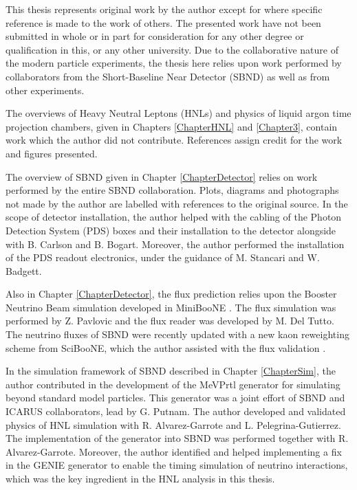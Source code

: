 
\begin{declaration}

This thesis represents original work by the author except for where specific reference is made to the work of others.
The presented work have not been submitted in whole or in part for consideration for any other degree or qualification in this, or any other university. 
Due to the collaborative nature of the modern particle experiments, the thesis here relies upon work performed by collaborators from the Short-Baseline Near Detector (SBND) as well as from other experiments.

The overviews of Heavy Neutral Leptons (HNLs) and physics of liquid argon time projection chambers, given in Chapters \ref{ChapterHNL} and \ref{Chapter3}, contain work which the author did not contribute.
References assign credit for the work and figures presented.

The overview of SBND given in Chapter \ref{ChapterDetector} relies on work performed by the entire SBND collaboration.
Plots, diagrams and photographs not made by the author are labelled with references to the original source.
In the scope of detector installation, the author helped with the cabling of the Photon Detection System (PDS) boxes and their installation to the detector alongside with B. Carlson and B. Bogart.
Moreover, the author performed the installation of the PDS readout electronics, under the guidance of M. Stancari and W. Badgett.

Also in Chapter \ref{ChapterDetector}, the flux prediction relies upon the Booster Neutrino Beam simulation developed in MiniBooNE \cite{BNBFlux}.
The flux simulation was performed by Z. Pavlovic and the flux reader was developed by M. Del Tutto. 
The neutrino fluxes of SBND were recently updated with a new kaon reweighting scheme from SciBooNE, which the author assisted with the flux validation \cite{SciBooNE}. 

In the simulation framework of SBND described in Chapter \ref{ChapterSim}, the author contributed in the development of the MeVPrtl generator for simulating beyond standard model particles.
This generator was a joint effort of SBND and ICARUS collaborators, lead by G. Putnam.
The author developed and validated physics of HNL simulation with R. Alvarez-Garrote and L. Pelegrina-Gutierrez.
The implementation of the generator into SBND was performed together with R. Alvarez-Garrote.
Moreover, the author identified and helped implementing a fix in the GENIE generator to enable the timing simulation of neutrino interactions, which was the key ingredient in the HNL analysis in this thesis.


\end{declaration}
